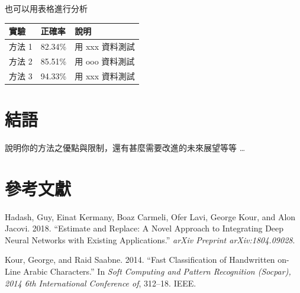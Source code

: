 \documentclass{article}
\begin{document}
也可以用表格進行分析

\begin{longtable}[]{@{}lll@{}}
\toprule
實驗 & 正確率 & 說明\tabularnewline
\midrule
\endhead
方法 1 & 82.34\% & 用 xxx 資料測試\tabularnewline
方法 2 & 85.51\% & 用 ooo 資料測試\tabularnewline
方法 3 & 94.33\% & 用 xxx 資料測試\tabularnewline
\bottomrule
\end{longtable}

\hypertarget{ux7d50ux8a9e}{%
\section{結語}\label{ux7d50ux8a9e}}

說明你的方法之優點與限制，還有甚麼需要改進的未來展望等等 \ldots{}

\hypertarget{ux53c3ux8003ux6587ux737b}{%
\section*{參考文獻}\label{ux53c3ux8003ux6587ux737b}}

\hypertarget{refs}{}
\leavevmode\hypertarget{ref-hadash2018estimate}{}%
Hadash, Guy, Einat Kermany, Boaz Carmeli, Ofer Lavi, George Kour, and
Alon Jacovi. 2018. ``Estimate and Replace: A Novel Approach to
Integrating Deep Neural Networks with Existing Applications.''
\emph{arXiv Preprint arXiv:1804.09028}.

\leavevmode\hypertarget{ref-kour2014fast}{}%
Kour, George, and Raid Saabne. 2014. ``Fast Classification of
Handwritten on-Line Arabic Characters.'' In \emph{Soft Computing and
Pattern Recognition (Socpar), 2014 6th International Conference of},
312--18. IEEE.
\end{document}
